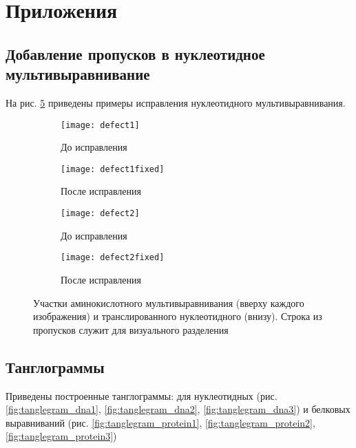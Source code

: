 \documentclass[main.tex]{subfiles}
\begin{document}
	\section{Приложения}
	\subsection{Добавление пропусков в нуклеотидное мультивыравнивание}
	На рис. \ref{fig:1} приведены примеры исправления нуклеотидного мультивыравнивания.
	\begin{figure}[H]
		\centering
		\begin{subfigure}{.5\textwidth}
			\centering
			\texttt{[image: defect1]}
			\caption{До исправления}
			\label{fig:defect1}
		\end{subfigure}%
		\begin{subfigure}{.5\textwidth}
			\centering
			\texttt{[image: defect1fixed]}
			\caption{После исправления}
			\label{fig:defect1fixed}
		\end{subfigure}
	
		\begin{subfigure}{.5\textwidth}
			\centering
			\texttt{[image: defect2]}
			\caption{До исправления}
			\label{fig:defect2}
		\end{subfigure}%
		\begin{subfigure}{.5\textwidth}
			\centering
			\texttt{[image: defect2fixed]}
			\caption{После исправления}
			\label{fig:defect2fixed}
		\end{subfigure}
		\caption{Участки аминокислотного мультивыравнивания (вверху каждого изображения) и транслированного нуклеотидного (внизу). Строка из пропусков служит для визуального разделения}
		\label{fig:1}
	\end{figure}

	\newpage
	\subsection{Танглограммы}
	Приведены построенные танглограммы: для нуклеотидных (рис. \ref{fig:tanglegram_dna1}, \ref{fig:tanglegram_dna2}, \ref{fig:tanglegram_dna3}) и белковых выравниваний (рис. \ref{fig:tanglegram_protein1}, \ref{fig:tanglegram_protein2}, \ref{fig:tanglegram_protein3})
	
	\newcommand{\mypicture}[2]{
		\begin{figure}[H]
			\centering \texttt{[image: \#1]}
			\caption{#2}
			\label{fig:#1}
		\end{figure}
	}
\end{document}
